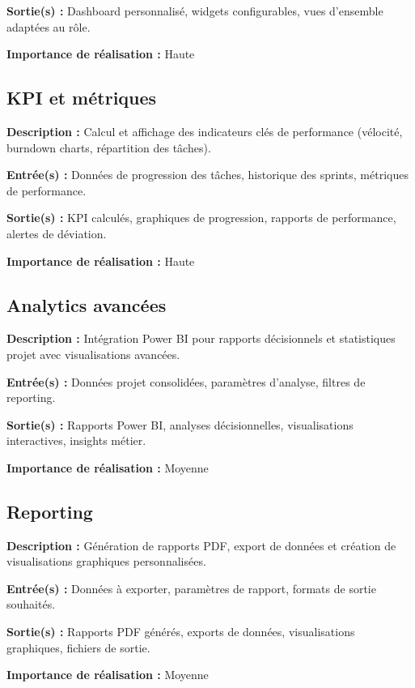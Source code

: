 \textbf{Sortie(s) :} Dashboard personnalisé, widgets configurables, vues d'ensemble adaptées au rôle.

\textbf{Importance de réalisation :} Haute

\subsection{KPI et métriques}
\textbf{Description :} Calcul et affichage des indicateurs clés de performance (vélocité, burndown charts, répartition des tâches).

\textbf{Entrée(s) :} Données de progression des tâches, historique des sprints, métriques de performance.

\textbf{Sortie(s) :} KPI calculés, graphiques de progression, rapports de performance, alertes de déviation.

\textbf{Importance de réalisation :} Haute

\subsection{Analytics avancées}
\textbf{Description :} Intégration Power BI pour rapports décisionnels et statistiques projet avec visualisations avancées.

\textbf{Entrée(s) :} Données projet consolidées, paramètres d'analyse, filtres de reporting.

\textbf{Sortie(s) :} Rapports Power BI, analyses décisionnelles, visualisations interactives, insights métier.

\textbf{Importance de réalisation :} Moyenne

\subsection{Reporting}
\textbf{Description :} Génération de rapports PDF, export de données et création de visualisations graphiques personnalisées.

\textbf{Entrée(s) :} Données à exporter, paramètres de rapport, formats de sortie souhaités.

\textbf{Sortie(s) :} Rapports PDF générés, exports de données, visualisations graphiques, fichiers de sortie.

\textbf{Importance de réalisation :} Moyenne

